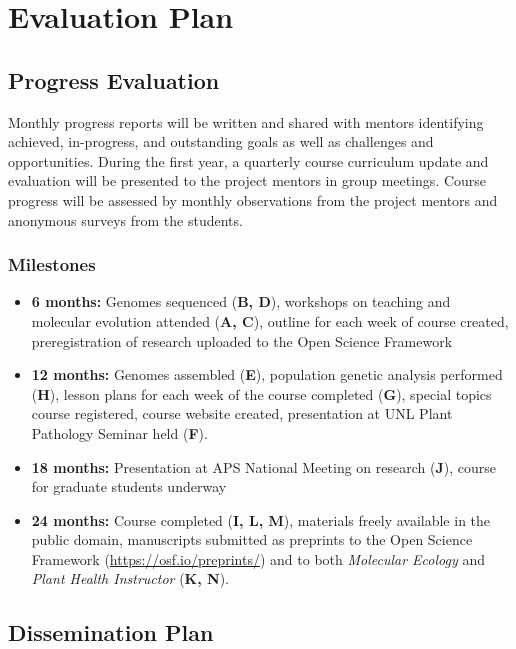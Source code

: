 \documentclass[12pt,letterpaper]{article}
\begin{document}

\section{Evaluation Plan}

\subsection{Progress Evaluation}

Monthly progress reports will be written and shared with mentors identifying achieved, in-progress, and outstanding goals as well as challenges and opportunities. During the first year, a quarterly course curriculum update and evaluation will be presented to the project mentors in group meetings. Course progress will be assessed by monthly observations from the project mentors and anonymous surveys from the students. 

\subsubsection*{Milestones}
\begin{itemize}
  \item \textbf{6 months:} Genomes sequenced (\textbf{B, D}), workshops on teaching and molecular evolution attended (\textbf{A, C}), outline for each week of course created, preregistration of research uploaded to the Open Science Framework
  \item \textbf{12 months:} Genomes assembled (\textbf{E}), population genetic analysis performed (\textbf{H}), lesson plans for each week of the course completed (\textbf{G}), special topics course registered, course website created, presentation at UNL Plant Pathology Seminar held (\textbf{F}).
  \item \textbf{18 months:} Presentation at APS National Meeting on research (\textbf{J}), course for graduate students underway
  \item \textbf{24 months:} Course completed (\textbf{I, L, M}), materials freely available in the public domain, manuscripts submitted as preprints to the Open Science Framework (\url{https://osf.io/preprints/}) and to both \textit{Molecular Ecology} and \textit{Plant Health Instructor} (\textbf{K, N}).
\end{itemize}

\subsection{Dissemination Plan}
\end{document}
